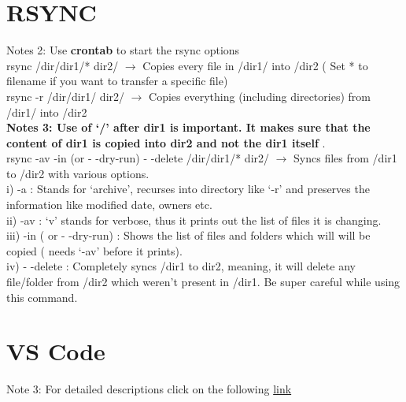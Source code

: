 \documentclass[twoside,a4paper]{article}
\newcommand{\tcb}{\color{blue}}
\newcommand{\tcc}{\color{cyan}}
\newcommand{\tcr}{\color{red}}
\newcommand{\tcg}{\color{gray}}
\newcommand{\tco}{\color{orange}}
\newcommand{\tcp}{\color{purple}}
\newcommand{\tck}{\color{black}}
\newcommand{\ra }{$\rightarrow$ }
\newcommand{\hs}{\hspace}
\begin{document}
	\newpage
\begin{multicols}{2}

	\tcc \section{RSYNC}
	\hs{-0.5cm}\tcg  Notes 2: Use \textbf{crontab} to start 
	the rsync options\\
	\hs{-0.5 cm}\tcr rsync \tcp /dir/dir1/* 
	\tco dir2/ \tck  \ra Copies every file in
	\tcp /dir1/ into \tco  /dir2 \tck ( Set *
	to filename if you want to transfer a specific file)\\
	\tcr rsync -r \tcp /dir/dir1/ \tco dir2/ 
	\tck  \ra Copies everything (including directories)
	from \tcp  /dir1/ \tck  into \tco /dir2
	\tck \\
	\tcg \textbf{Notes 3: Use of \textbf{`/'} after \textbf{dir1} is 
	important. It makes sure that the content of \textbf{dir1} is copied 
	into \textbf{dir2} and not the \textbf{dir1} itself }.\\

	\hs{-0.5 cm}\tcr rsync \tcb  -av -in (or - -dry-run) 
	- -delete \tcp /dir/dir1/* \tco dir2/ 
	\tck \ra Syncs files from \tcp /dir1 to 
	\tcp /dir2 with various options.\\
	\hs{1 cm} i) \tcb  -a : \tck  Stands for `archive', 
	recurses into directory like `-r' and preserves the information like 
	modified date, owners etc.\\
	\hs{1 cm} ii) \tcb  -av : \tck  `v' stands for 
	verbose, thus it prints out the list of files it is changing.\\
	\hs{1 cm} iii) \tcb  -in ( or - -dry-run) : \tck  
	Shows the list of files and folders which will will be copied ( needs 
	`-av' before it prints).\\
	\hs{1 cm} iv) \tcb  - -delete : \tck  Completely 
	syncs \tcp  /dir1 \tck  to \tcp  dir2, 
	meaning, it will delete any file/folder from \tcp  /dir2
	\tck  which weren't present in \tcp  /dir1. 
	\tck  Be super careful while using this command.\\
 
 
\tcc \section{VS Code}

    \hs{-0.5cm}\tcg Note 3: For detailed descriptions click on the following 
    \href{https://code.visualstudio.com/docs/getstarted/tips-and-tricks}{link}
    

\end{multicols}
\end{document}
